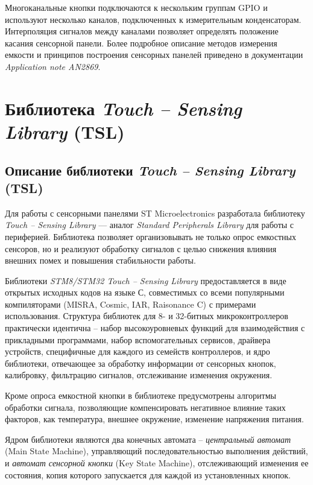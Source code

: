 Многоканальные кнопки подключаются к нескольким группам GPIO и используют несколько каналов, подключенных к измерительным конденсаторам. Интерполяция сигналов между каналами позволяет определять положение касания сенсорной панели. Более подробное описание методов измерения емкости и принципов построения сенсорных панелей приведено в документации \textit{Application note AN2869}.

\section{Библиотека \textit{Touch --  Sensing Library} (TSL)}
\subsection{Описание библиотеки \textit{Touch --  Sensing Library} (TSL)}

Для работы с сенсорными панелями ST Microelectronics разработала библиотеку \textit{Touch --  Sensing Library} --- аналог \textit{Standard Peripherals Library} для работы с периферией. Библиотека позволяет организовывать не только опрос емкостных сенсоров, но и реализуют обработку сигналов с целью снижения влияния внешних помех и повышения стабильности работы. 
	
	 Библиотеки \textit{STM8/STM32 Touch --  Sensing Library} предоставляется в виде открытых исходных кодов на языке С, совместимых со всеми популярными компиляторами (MISRA, Cosmic, IAR, Raisonance C) с примерами использования. Структура библиотек для 8- и 32-битных микроконтроллеров практически идентична -- набор высокоуровневых функций для взаимодействия с прикладными программами, набор вспомогательных сервисов, драйвера устройств, специфичные для каждого из семейств контроллеров, и ядро библиотеки, отвечающее за обработку информации от сенсорных кнопок, калибровку, фильтрацию сигналов, отслеживание изменения окружения. 

Кроме опроса емкостной кнопки в библиотеке предусмотрены алгоритмы обработки сигнала, позволяющие компенсировать негативное влияние таких факторов, как температура, внешнее окружение, изменение напряжения питания. 
 	
 	Ядром библиотеки являются два конечных автомата -- \textit{центральный автомат} (Main State Machine), управляющий последовательностью выполнения действий, и \textit{автомат сенсорной кнопки} (Key State Machine), отслеживающий изменения ее состояния, копия которого запускается для каждой из установленных кнопок.


